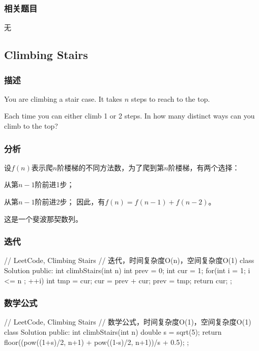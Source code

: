 \subsubsection{相关题目}
\begindot
\item 无
\myenddot


\subsection{Climbing Stairs} %
\label{sec:climbing-stairs}


\subsubsection{描述}
You are climbing a stair case. It takes $n$ steps to reach to the top.

Each time you can either climb 1 or 2 steps. In how many distinct ways can you climb to the top?


\subsubsection{分析}
设$f(n)$表示爬$n$阶楼梯的不同方法数，为了爬到第$n$阶楼梯，有两个选择：
\begindot
\item 从第$n-1$阶前进1步；
\item 从第$n-1$阶前进2步；
\myenddot
因此，有$f(n)=f(n-1)+f(n-2)$。

这是一个斐波那契数列。


\subsubsection{迭代}
\begin{Code}
// LeetCode, Climbing Stairs
// 迭代，时间复杂度O(n)，空间复杂度O(1)
class Solution {
public:
    int climbStairs(int n) {
        int prev = 0;
        int cur = 1;
        for(int i = 1; i <= n ; ++i){
            int tmp = cur;
            cur = prev + cur;
            prev = tmp;
        }
        return cur;
    }
};
\end{Code}


\subsubsection{数学公式}
\begin{Code}
// LeetCode, Climbing Stairs
// 数学公式，时间复杂度O(1)，空间复杂度O(1)
class Solution {
    public:
    int climbStairs(int n) {
        double s = sqrt(5);
        return floor((pow((1+s)/2, n+1) + pow((1-s)/2, n+1))/s + 0.5);
    }
};
\end{Code}


